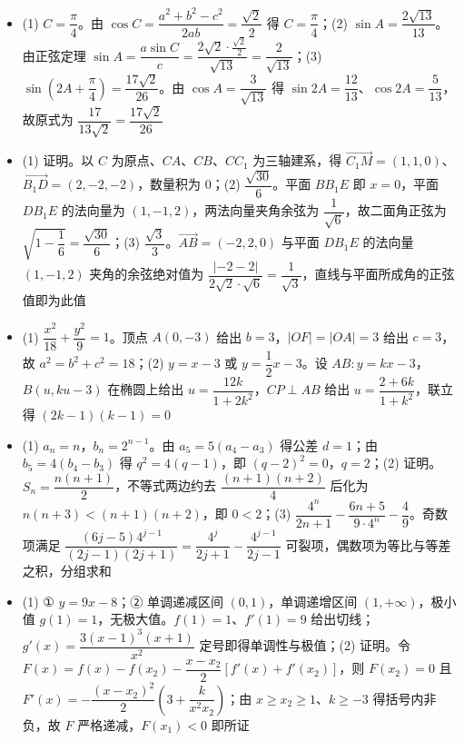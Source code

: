 \begin{itemize}[leftmargin=2.6em]
  \item[\textbf{16.}] (1) $C=\dfrac\pi4$。由 $\cos C=\dfrac{a^2+b^2-c^2}{2ab}=\dfrac{\sqrt2}2$ 得 $C=\dfrac\pi4$；(2) $\sin A=\dfrac{2\sqrt{13}}{13}$。由正弦定理 $\sin A=\dfrac{a\sin C}{c}=\dfrac{2\sqrt2\cdot\frac{\sqrt2}2}{\sqrt{13}}=\dfrac2{\sqrt{13}}$；(3) $\sin\left(2A+\dfrac\pi4\right)=\dfrac{17\sqrt2}{26}$。由 $\cos A=\dfrac3{\sqrt{13}}$ 得 $\sin2A=\dfrac{12}{13}$、$\cos2A=\dfrac5{13}$，故原式为 $\dfrac{17}{13\sqrt2}=\dfrac{17\sqrt2}{26}$
  \item[\textbf{17.}] (1) 证明。以 $C$ 为原点、$CA$、$CB$、$CC_1$ 为三轴建系，得 $\overrightarrow{C_1M}=(1,1,0)$、$\overrightarrow{B_1D}=(2,-2,-2)$，数量积为 $0$；(2) $\dfrac{\sqrt{30}}6$。平面 $BB_1E$ 即 $x=0$，平面 $DB_1E$ 的法向量为 $(1,-1,2)$，两法向量夹角余弦为 $\dfrac1{\sqrt6}$，故二面角正弦为 $\sqrt{1-\dfrac16}=\dfrac{\sqrt{30}}6$；(3) $\dfrac{\sqrt3}3$。$\overrightarrow{AB}=(-2,2,0)$ 与平面 $DB_1E$ 的法向量 $(1,-1,2)$ 夹角的余弦绝对值为 $\dfrac{|{-2-2}|}{2\sqrt2\cdot\sqrt6}=\dfrac{1}{\sqrt3}$，直线与平面所成角的正弦值即为此值
  \item[\textbf{18.}] (1) $\dfrac{x^2}{18}+\dfrac{y^2}9=1$。顶点 $A(0,-3)$ 给出 $b=3$，$|OF|=|OA|=3$ 给出 $c=3$，故 $a^2=b^2+c^2=18$；(2) $y=x-3$ 或 $y=\dfrac12x-3$。设 $AB:y=kx-3$，$B(u,ku-3)$ 在椭圆上给出 $u=\dfrac{12k}{1+2k^2}$，$CP\perp AB$ 给出 $u=\dfrac{2+6k}{1+k^2}$，联立得 $(2k-1)(k-1)=0$
  \item[\textbf{19.}] (1) $a_n=n$，$b_n=2^{n-1}$。由 $a_5=5(a_4-a_3)$ 得公差 $d=1$；由 $b_5=4(b_4-b_3)$ 得 $q^2=4(q-1)$，即 $(q-2)^2=0$，$q=2$；(2) 证明。$S_n=\dfrac{n(n+1)}2$，不等式两边约去 $\dfrac{(n+1)(n+2)}4$ 后化为 $n(n+3)<(n+1)(n+2)$，即 $0<2$；(3) $\dfrac{4^n}{2n+1}-\dfrac{6n+5}{9\cdot4^n}-\dfrac49$。奇数项满足 $\dfrac{(6j-5)4^{j-1}}{(2j-1)(2j+1)}=\dfrac{4^j}{2j+1}-\dfrac{4^{j-1}}{2j-1}$ 可裂项，偶数项为等比与等差之积，分组求和
  \item[\textbf{20.}] (1) ① $y=9x-8$；② 单调递减区间 $(0,1)$，单调递增区间 $(1,+\infty)$，极小值 $g(1)=1$，无极大值。$f(1)=1$、$f'(1)=9$ 给出切线；$g'(x)=\dfrac{3(x-1)^3(x+1)}{x^2}$ 定号即得单调性与极值；(2) 证明。令 $F(x)=f(x)-f(x_2)-\dfrac{x-x_2}2\left[f'(x)+f'(x_2)\right]$，则 $F(x_2)=0$ 且 $F'(x)=-\dfrac{(x-x_2)^2}2\left(3+\dfrac{k}{x^2x_2}\right)$；由 $x\geqslant x_2\geqslant1$、$k\geqslant-3$ 得括号内非负，故 $F$ 严格递减，$F(x_1)<0$ 即所证
\end{itemize}
